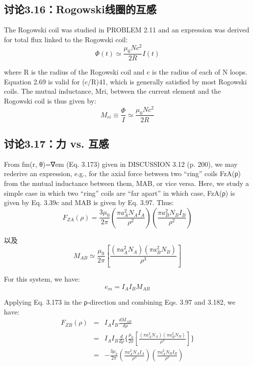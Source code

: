 \subsection{讨论3.16：Rogowski线圈的互感}
The Rogowski coil was studied in PROBLEM 2.11 and an expression was derived
for total flux linked to the Rogowski coil:
 \begin{equation}%
\Phi(t)\simeq\frac{\mu_0Nc^2}{2R}I(t)
\end{equation}

where R is the radius of the Rogowski coil and c is the radius of each of N loops.
Equation 2.69 is valid for (c/R)41, which is generally satisfied by most Rogowski
coils. The mutual inductance, Mri, between the current element and the Rogowski
coil is thus given by:
 \begin{equation}%
M_{ri}\equiv\frac{\Phi}{I}\simeq\frac{\mu_0Nc^2}{2R}
\end{equation}

\newpage



\subsection{讨论3.17：力 vs. 互感}
From fm(r, θ)=∇em (Eq. 3.173) given in DISCUSSION 3.12 (p. 200), we may rederive an expression, e.g., for the axial force between two “ring” coils FzA(ρ) from
the mutual inductance between them, MAB, or vice versa. Here, we study a simple
case in which two “ring” coils are “far apart” in which case, FzA(ρ) is given by
Eq. 3.39c and MAB is given by Eq. 3.97. Thus:
 \begin{equation}%
F_{ZA}(\rho)=\frac{3\mu_0}{2\pi}(\frac{\pi a_{A}^{2}N_AI_A}{\rho^2})(\frac{\pi a_{B}^{2}N_BI_B}{\rho^2})
\end{equation}

以及
\begin{equation}%
M_{AB}\simeq\frac{\mu_0}{2\pi}[\frac{(\pi a_{A}^{2}N_A)(\pi a_{B}^{2}N_B)}{\rho^3}]
\end{equation}

For this system, we have:
\begin{equation}%
e_m=I_AI_BM_{AB}
\end{equation}

Applying Eq. 3.173 in the ρ-direction and combining Eqs. 3.97 and 3.182, we have:
\begin{eqnarray}%
F_{ZB}(\rho)&=&I_A I_B\frac{dM_{AB}}{d\rho}\\
&=&I_A I_B\frac{d}{d\rho}\{\frac{\mu_0}{2\pi}[\frac{(\pi a_{A}^{2}N_A)(\pi a_{B}^{2}N_B)}{\rho^3}]\}\\
&=&-\frac{3\mu_0}{2\pi}(\frac{\pi a_{A}^{2}N_A I_A}{\rho^2})(\frac{\pi a_{A}^{2}N_B I_B}{\rho^2})
\end{eqnarray}

